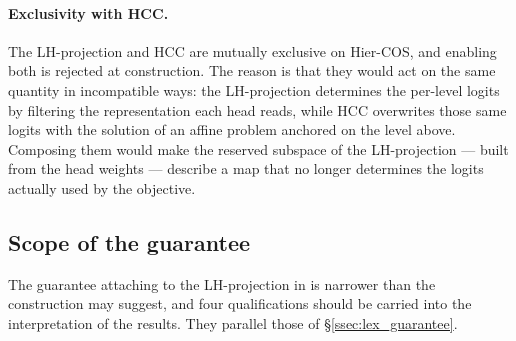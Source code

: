 \paragraph{Exclusivity with HCC.} The LH-projection and HCC are mutually exclusive
on Hier-COS, and enabling both is rejected at construction. The reason is that they
would act on the same quantity in incompatible ways: the LH-projection determines
the per-level logits by filtering the representation each head reads, while HCC
overwrites those same logits with the solution of an affine problem anchored on the
level above. Composing them would make the reserved subspace of the LH-projection
--- built from the head weights --- describe a map that no longer determines the
logits actually used by the objective.

\subsection{Scope of the guarantee}
\label{ssec:lhproj_limits}

The guarantee attaching to the LH-projection in \cite{fiaschi2024informed} is
narrower than the construction may suggest, and four qualifications should be
carried into the interpretation of the results. They parallel those of
\S\ref{ssec:lex_guarantee}.

